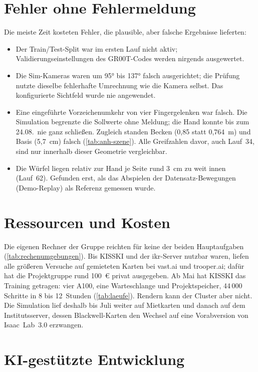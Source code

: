 \section{Fehler ohne Fehlermeldung}
\label{sec:projektverlauf-fehler}
\label{sec:vorbehalt-greifzahlen}
\label{sec:kalibrierung}
Die meiste Zeit kosteten Fehler, die plausible, aber falsche Ergebnisse lieferten:
\begin{itemize}
  \item Der Train/Test-Split war im ersten Lauf nicht aktiv; Validierungseinstellungen des
    GR00T-Codes werden nirgends ausgewertet.
  \item Die Sim-Kameras waren um 95° bis 137° falsch ausgerichtet; die Prüfung nutzte dieselbe
    fehlerhafte Umrechnung wie die Kamera selbst. Das konfigurierte Sichtfeld wurde nie
    angewendet.
  \item Eine eingeführte Vorzeichenumkehr von vier Fingergelenken war falsch. Die Simulation
    begrenzte die Sollwerte ohne Meldung; die Hand konnte bis zum 24.08.\ nie ganz schließen.
    Zugleich standen Becken (0,85 statt 0,764~m) und Basis (5,7~cm) falsch (\cref{tab:anh-szene}). Alle Greifzahlen
    davor, auch Lauf~34, sind nur innerhalb dieser Geometrie vergleichbar.
  \item Die Würfel liegen relativ zur Hand je Seite rund 3~cm zu weit innen (Lauf~62). Gefunden
    erst, als das Abspielen der Datensatz-Bewegungen (Demo-Replay) als Referenz gemessen
    wurde.
\end{itemize}

\section{Ressourcen und Kosten}
\label{sec:ressourcen}

Die eigenen Rechner der Gruppe reichten für keine der beiden Hauptaufgaben
(\cref{tab:rechenumgebungen}). Bis KISSKI und der \acs{ikr}-Server nutzbar waren, liefen alle
größeren Versuche auf gemieteten Karten bei vast.ai und trooper.ai; dafür hat die
Projektgruppe rund 100~€ privat ausgegeben. Ab Mai hat KISSKI das Training getragen: vier
A100, eine Warteschlange und Projektspeicher, 44\,000 Schritte in 8 bis 12~Stunden
(\cref{tab:laeufe}). Rendern kann der Cluster aber nicht. Die Simulation lief deshalb bis Juli
weiter auf Mietkarten und danach auf dem Institutsserver, dessen Blackwell-Karten den Wechsel
auf eine Vorabversion von Isaac~Lab~3.0 erzwangen.

\section{KI-gestützte Entwicklung}
\label{sec:ki-entwicklung}
\label{sec:entwicklungsumgebung}

